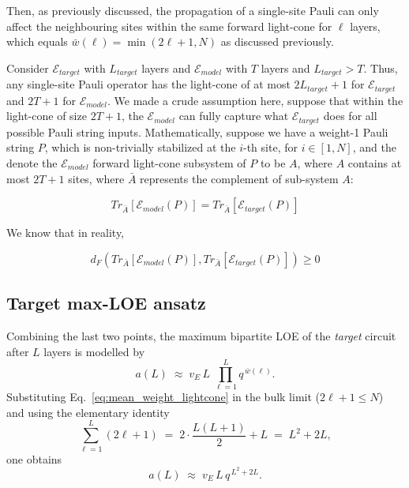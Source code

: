 \documentclass[%
 reprint,
superscriptaddress,
 amsmath,amssymb,
 aps,
]{revtex4-2}
\newcommand{\E}{\mathcal{E}}
\begin{document}
Then, as previously discussed, the propagation of a single-site Pauli can only affect the neighbouring sites within the same forward light-cone for $\ell$ layers, which equals $\bar{w}(\ell) = \min(2\ell+1, N)$ as discussed previously.

Consider $\E_{target}$ with $L_{target}$ layers and $\E_{model}$ with $T$ layers and $L_{target}>T$. Thus, any single-site Pauli operator has the light-cone of at most $2L_{target}+1$ for $\E_{target}$ and $2T+1$ for $\E_{model}$. We made a crude assumption here, suppose that within the light-cone of size $2T+1$, the $\E_{model}$ can fully capture what $\E_{target}$ does for all possible Pauli string inputs. Mathematically, suppose we have a weight-1 Pauli string $P$, which is non-trivially stabilized at the $i$-th site, for $i\in[1, N]$, and the denote the $\E_{model}$ forward light-cone subsystem of $P$ to be $A$, where $A$ contains at most $2T+1$ sites, where $\bar{A}$ represents the complement of sub-system $A$:

\begin{equation}
    Tr_{\bar{A}}[\E_{model}(P)] = Tr_{\bar{A}}[\E_{target}(P)]
\end{equation}

We know that in reality, 

\begin{equation}
    d_F\left(Tr_{\bar{A}}[\E_{model}(P)], Tr_{\bar{A}}[\E_{target}(P)]\right)\ge 0
\end{equation}



\subsection{Target max-LOE ansatz}

Combining the last two points, the maximum bipartite LOE of the \emph{target} circuit after $L$ layers is modelled by
\begin{equation}
    \boxed{\;a(L) \;\approx\; v_E\, L \;\prod_{\ell=1}^{L} q^{\,\bar w(\ell)}.\;}
    \label{eq:aL_ansatz_new}
\end{equation}
Substituting Eq.~\eqref{eq:mean_weight_lightcone} in the bulk limit ($2\ell+1\le N$) and using the elementary identity
\begin{equation}
    \sum_{\ell=1}^{L}(2\ell+1) \;=\; 2\cdot\frac{L(L+1)}{2}+L \;=\; L^2 + 2L,
    \label{eq:exponent_sum}
\end{equation}
one obtains
\begin{equation}
    a(L) \;\approx\; v_E\, L\, q^{\,L^2+2L}.
    \label{eq:aL_closed}
\end{equation}
\end{document}
